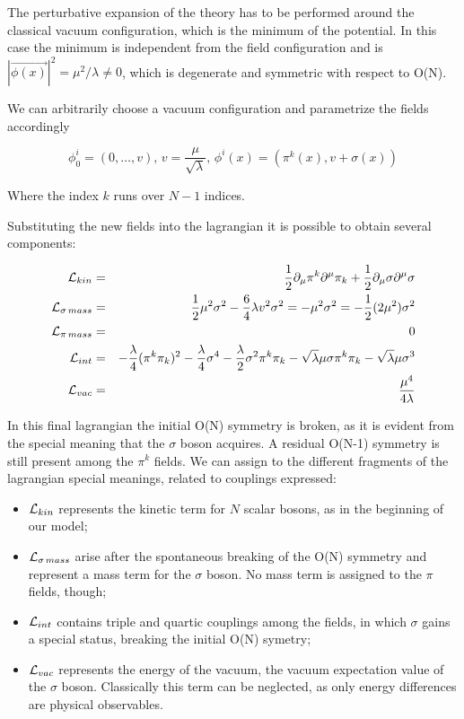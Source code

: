 The perturbative expansion of the theory has to be performed around the classical vacuum configuration, which is the minimum of the potential. In this case the minimum is independent from the field configuration and is $|\vec{\phi(x)}|^2 = \mu^2 / \lambda \neq 0$, which is degenerate and symmetric with respect to O(N).

We can arbitrarily choose a vacuum configuration and parametrize the fields accordingly

\begin{equation}
\phi_0^i = (0, \ldots, v), \, v= \dfrac{\mu}{\sqrt{\lambda}}, \, \phi^i(x) = (\pi^k(x), v + \sigma(x))
\end{equation}

Where the index $k$ runs over $N-1$ indices. 

Substituting the new fields into the lagrangian it is possible to obtain several components:

\begin{eqnarray}
\mathcal{L}_{kin} &=& \dfrac{1}{2} \partial_\mu \pi^k \partial^\mu \pi_k + \dfrac{1}{2}  \partial_\mu \sigma \partial^\mu \sigma \nonumber \\
\mathcal{L}_{\sigma \, mass} &=& \dfrac{1}{2} \mu^2 \sigma^2 - \dfrac{6}{4} \lambda v^2 \sigma^2 = - \mu^2 \sigma^2 = -\dfrac{1}{2} (2\mu^2) \sigma^2 \nonumber \\
\mathcal{L}_{\pi \, mass} &=& 0 \nonumber \\
\mathcal{L}_{int} &=& - \dfrac{\lambda}{4} (\pi^k\pi_k)^2 - \dfrac{\lambda}{4} \sigma^4 - \dfrac{\lambda}{2} \sigma^2 \pi^k \pi_k - \sqrt{\lambda} \mu \sigma \pi^k \pi_k - \sqrt{\lambda} \mu \sigma^3 \nonumber \\
\mathcal{L}_{vac} &=& \dfrac{\mu^4}{4\lambda} 
\end{eqnarray}

In this final lagrangian the initial O(N) symmetry is broken, as it is evident from the special meaning that the $\sigma$ boson acquires. A residual O(N-1) symmetry is still present among the $\pi^k$ fields.
We can assign to the different fragments of the lagrangian special meanings, related to couplings expressed:
\begin{itemize}
\item $\mathcal{L}_{kin}$ represents the kinetic term for $N$ scalar bosons, as in the beginning of our model;
\item $\mathcal{L}_{\sigma \, mass}$ arise after the spontaneous breaking of the O(N) symmetry and represent a mass term for the $\sigma$ boson. No mass term is assigned to the $\pi$ fields, though;
\item $\mathcal{L}_{int}$ contains triple and quartic couplings among the fields, in which $\sigma$ gains a special status, breaking the initial O(N) symetry;
\item $\mathcal{L}_{vac}$ represents the energy of the vacuum, the vacuum expectation value of the $\sigma$ boson. Classically this term can be neglected, as only energy differences are physical observables.
\end{itemize}

